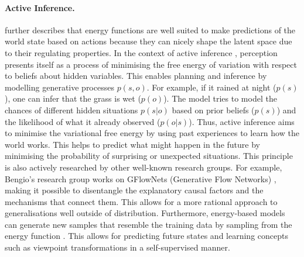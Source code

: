 \paragraph{Active Inference.}  further describes that energy functions are well suited to make predictions of the world state based on actions because they can nicely shape the latent space due to their regulating properties.
In the context of active inference , perception presents itself as a process of minimising the free energy of variation with respect to beliefs about hidden variables. This enables planning and inference by modelling generative processes $p(s,o)$. For example, if it rained at night ($p(s)$), one can infer that the grass is wet ($p(o)$). The model tries to model the chances of different hidden situations $p(s|o)$ based on prior beliefs ($p(s)$) and the likelihood of what it already observed ($p(o|s)$). 
Thus, active inference aims to minimise the variational free energy by using past experiences to learn how the world works. This helps to predict what might happen in the future by minimising the probability of surprising or unexpected situations.
This principle is also actively researched by other well-known research groups. For example, Bengio's research group works on GFlowNets (Generative Flow Networks) , making it possible to disentangle the explanatory causal factors and the mechanisms that connect them. This allows for a more rational approach to generalisations well outside of distribution.
Furthermore, energy-based models can generate new samples that resemble the training data by sampling from the energy function . This allows for predicting future states and learning concepts such as viewpoint transformations in a self-supervised manner.

